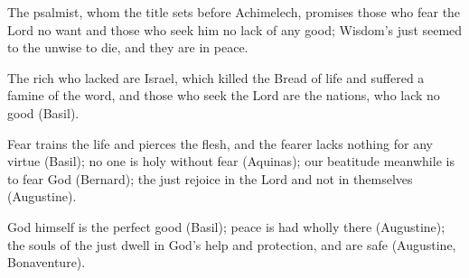 \begin{fourSenses}
\item[Literal.] The psalmist, whom the title sets before Achimelech, promises
those who fear the Lord no want and those who seek him no lack of any good;
Wisdom's just seemed to the unwise to die, and they are in peace.
\item[Allegorical.] The rich who lacked are Israel, which killed the Bread of
life and suffered a famine of the word, and those who seek the Lord are the
nations, who lack no good (Basil).
\item[Moral.] Fear trains the life and pierces the flesh, and the fearer lacks
nothing for any virtue (Basil); no one is holy without fear (Aquinas); our
beatitude meanwhile is to fear God (Bernard); the just rejoice in the Lord and
not in themselves (Augustine).
\item[Anagogical.] God himself is the perfect good (Basil); peace is had wholly
there (Augustine); the souls of the just dwell in God's help and protection,
and are safe (Augustine, Bonaventure).
\end{fourSenses}
